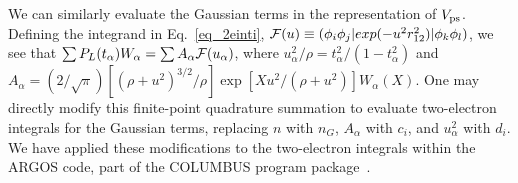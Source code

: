 We can similarly evaluate the Gaussian terms in the
representation of $V_{\rm ps}$. 
Defining the integrand in Eq.~\ref{eq_2einti}, 
${\cal F}(u) \equiv (\phi_i\phi_j| exp(-u^2 r_{12}^2) |\phi_k\phi_l)$,
we see that $ \sum P_L(t_\alpha) W_\alpha = \sum A_\alpha {\cal F}(u_\alpha)$,
where $u_\alpha^2/\rho = t_\alpha^2/(1-t_\alpha^2)$ and 
$A_\alpha = (2/\sqrt\pi) [(\rho+u^2)^{3/2} / \rho] \exp[Xu^2/(\rho+u^2)]W_\alpha(X)$. 
One may directly modify this finite-point quadrature summation to 
evaluate two-electron integrals for the Gaussian terms, 
replacing $n$ with $n_G$, $A_\alpha$ with $c_i$, and $u_\alpha^2$ with $d_i$.  
We have applied these modifications to the two-electron integrals 
within the ARGOS code, part of the COLUMBUS program package~\cite{COLUMBUS}.



%
